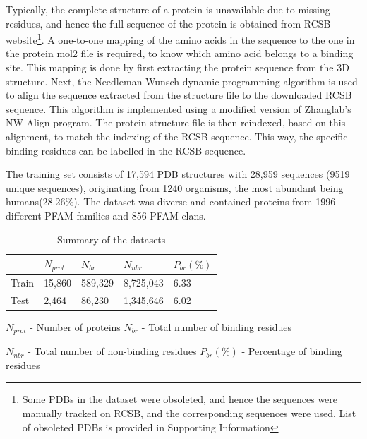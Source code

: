 \documentclass[journal=jacsat,manuscript=article]{achemso}
\begin{document}
Typically, the complete structure of a protein is unavailable due to missing residues, and hence the full sequence of the protein is obtained from RCSB \cite{burley2019rcsb} website\footnote{Some PDBs in the dataset were obsoleted, and hence the sequences were manually tracked on RCSB, and the corresponding sequences were used. List of obsoleted PDBs is provided in Supporting Information}. A one-to-one mapping of the amino acids in the sequence to the one in the protein mol2 file is required, to know which amino acid belongs to a binding site. This mapping is done by first extracting the protein sequence from the 3D structure. Next, the Needleman-Wunsch dynamic programming algorithm is used to align the sequence extracted from the structure file to the downloaded RCSB sequence. This algorithm is implemented using a modified version of Zhanglab's NW-Align program\cite{NWAlign}. The protein structure file is then reindexed, based on this alignment, to match the indexing of the RCSB sequence. This way, the specific binding residues can be labelled in the RCSB sequence.


The training set consists of 17,594 PDB structures with 28,959 sequences (9519 unique sequences), originating from 1240 organisms, the most abundant being humans(28.26\%). The dataset was diverse and contained proteins from 1996 different PFAM families and 856 PFAM clans.

\begin{table}
    \centering
    \begin{tabular}{| P{2.75cm} | P{2.75cm} | P{2.75cm} | P{2.75cm} | P{2.75cm} |}
        \hline
              & $N_{prot}$ & $N_{br}$ & $N_{nbr}$ & $P_{br}(\%)$ \\
        \hline
        Train & 15,860     & 589,329  & 8,725,043 & 6.33         \\
        Test  & 2,464      & 86,230   & 1,345,646 & 6.02         \\
        \hline
    \end{tabular}
    \caption{\label{tab:dataset_summary} Summary of the datasets}
    \vspace{5 mm}
    \noindent $N_{prot}$ - Number of proteins \hfill $N_{br}$ - Total number of binding residues

    \vspace{3 mm}

    \noindent $N_{nbr}$ - Total number of non-binding residues \hfill $P_{br}(\%)$ - Percentage of binding residues
\end{table}
\end{document}
